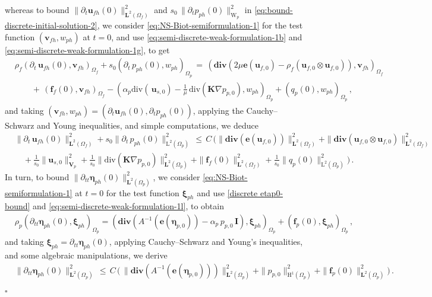 \documentclass[11pt]{article}
\numberwithin{equation}{section}
\newcommand{\bbeta}{{\boldsymbol\eta}}
\newcommand{\bxi}{{\boldsymbol\xi}}
\newcommand{\bv}{{\mathbf{v}}}
\newcommand{\f}{\mathbf{f}}
\newcommand{\bu}{\mathbf{u}}
\newcommand{\be}{{\mathbf{e}}}
\newcommand{\0}{{\mathbf{0}}}
\def\bK{\mathbf{K}}
\def\bI{\mathbf{I}}
\def\bV{\mathbf{V}}
\newcommand{\bL}{\mathbf{L}}
\def\H{\mathrm{H}}
\def\L{\mathrm{L}}
\def\W{\mathrm{W}}
\def\bdiv{\mathbf{div}}
\def\div{\mathrm{div}}
\newenvironment{proof}{\noindent{\it Proof.}}{\hfill$\square$}
\numberwithin{equation}{section}
\begin{document}
\begin{proof}
whereas to bound $\|\partial_t\bu_{fh}(0)\|^2_{\bL^2(\Omega_f)}$ and  
$s_0\,\|\partial_t p_{ph}(0)\|^2_{\W_p}$ in \eqref{eq:bound-discrete-initial-solution-2}, we consider \eqref{eq:NS-Biot-semiformulation-1} for the test function $(\bv_{fh}, w_{ph})$ at $t=0$, and use \eqref{eq:semi-discrete-weak-formulation-1b} and \eqref{eq:semi-discrete-weak-formulation-1g}, to get 
%
\begin{align*}%
&  \rho_f (\partial_t\,\bu_{fh}(0),\bv_{fh})_{\Omega_f} +  s_0 (\partial_t\,p_{ph}(0),w_{ph})_{\Omega_p} 
\,=\, (\bdiv(2\mu\be(\bu_{f,0}) - \rho_f(\bu_{f,0}\otimes \bu_{f,0})),\bv_{fh})_{\Omega_f} \nonumber \\[1ex]
&\qquad +\, (\f_{f}(0),\bv_{fh})_{\Omega_f} - (\alpha_p \div (\,\bu_{s,0})
- \frac{1}{\mu}\,\div(\bK\nabla p_{p,0}),w_{ph})_{\Omega_p} + (q_{p}(0),w_{ph})_{\Omega_p} \,,\nonumber
\end{align*}
%
and taking $(\bv_{fh}, w_{ph}) = (\partial_t\bu_{fh}(0), \partial_t p_{ph}(0))$, applying the Cauchy--Schwarz and Young inequalities, and simple computations, we deduce 
%
\begin{align}\label{eq: discrete initial 2}
&  \|\partial_t\,\bu_{fh}(0)\|^2_{\bL^2(\Omega_f)} +  s_0 \|\partial_t\,p_{ph}(0)\|^2_{\L^2(\Omega_p)}  
\,\leq\, C\,\Big(\|\bdiv(\be(\bu_{f,0}))\|^2_{\bL^{2}(\Omega_f)} 
+ \|\bdiv(\bu_{f,0}\otimes\bu_{f,0})\|^2_{\bL^{2}(\Omega_f)} \nonumber \\[1ex]
&\quad + \frac{1}{s_0} \|\bu_{s,0}\|^2_{\bV_p}
+ \frac{1}{s_0}\|\div(\bK\nabla p_{p,0})\|^2_{\bL^2(\Omega_p)}
+ \|\f_{f}(0)\|^2_{\bL^2(\Omega_f)} + \frac{1}{s_0}\|q_p(0)\|^2_{\L^2(\Omega_p)} \Big) \,.
\end{align}
%
In turn, to bound $\|\partial_{tt}\bbeta_{ph}(0)\|^2_{\bL^2(\Omega_p)}$, we consider \eqref{eq:NS-Biot-semiformulation-1} at $t=0$ for the test function $\bxi_{ph}$ and use \eqref{discrete etap0-bound} and \eqref{eq:semi-discrete-weak-formulation-1l}, to obtain
%
\begin{align*}%
&  \rho_p(\partial_{tt}\bbeta_{ph}(0),\bxi_{ph})_{\Omega_p} =  (\bdiv(A^{-1}(\be(\bbeta_{p,0})) - \alpha_p\,p_{p,0}\,\bI),\bxi_{ph})_{\Omega_p} + (\f_{p}(0),\bxi_{ph})_{\Omega_p} \,,
\end{align*}
and taking $\bxi_{ph} = \partial_{tt}\bbeta_{ph}(0)$, applying Cauchy--Schwarz and Young's inequalities, and some algebraic manipulations, we derive
%
\begin{align}\label{eq: discrete initial 6}
&  \|\partial_{tt}\bbeta_{ph}(0)\|^2_{\bL^2(\Omega_p)} 
\,\leq\, C\,\Big(\, \|\bdiv(A^{-1}(\be(\bbeta_{p,0})))\|^2_{\bL^2(\Omega_p)} + \|p_{p,0}\|^2_{\H^1(\Omega_p)} + \|\f_{p}(0)\|^2_{\bL^2(\Omega_p)} \Big) \,.
\end{align}


\end{proof}
\end{document}
